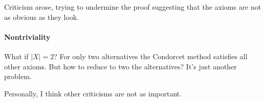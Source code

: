 Criticism arose, trying to undermine the proof suggesting that the axioms are not as obvious as they look.

\paragraph{Nontriviality} What if $|X| = 2$? For only two alternatives the Condorcet method satisfies all other axioms. But how to reduce to two the alternatives? It's just another problem.

Personally, I think other criticisms are not as important.

